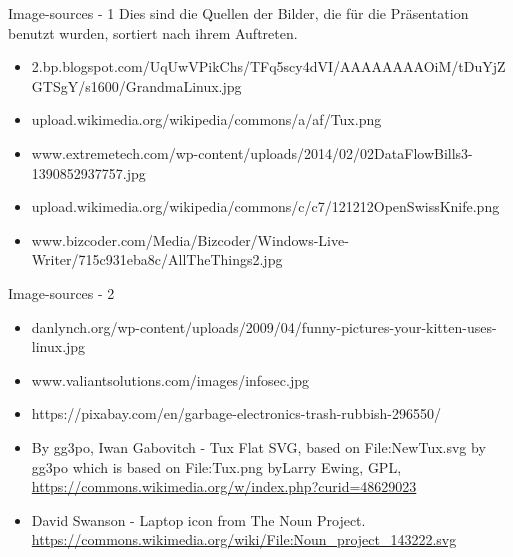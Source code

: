 \begin{frame}{Image-sources - 1}
Dies sind die Quellen der Bilder, die für die Präsentation benutzt wurden, sortiert nach ihrem Auftreten.
\begin{itemize}
	\item [1] 2.bp.blogspot.com/\textunderscore UqUwVPikChs/TFq5scy4dVI/AAAAAAAAOiM/tDuYjZGTSgY/s1600/GrandmaLinux.jpg
	\item [2] upload.wikimedia.org/wikipedia/commons/a/af/Tux.png
	\item [3] www.extremetech.com/wp-content/uploads/2014/02/02DataFlowBills3-1390852937757.jpg
	
	\item [4] upload.wikimedia.org/wikipedia/commons/c/c7/121212\textunderscore OpenSwissKnife.png
	\item [5] www.bizcoder.com/Media/Bizcoder/Windows-Live-Writer/715c931eba8c/AllTheThings\textunderscore 2.jpg
	
\end{itemize}

\end{frame}

\begin{frame}{Image-sources - 2}
\begin{itemize}
	\item [6] danlynch.org/wp-content/uploads/2009/04/funny-pictures-your-kitten-uses-linux.jpg
	\item [7] www.valiantsolutions.com/images/infosec.jpg
	\item [8] https://pixabay.com/en/garbage-electronics-trash-rubbish-296550/
	\item [9] By gg3po, Iwan Gabovitch - Tux Flat SVG, based on File:NewTux.svg by gg3po which is based on File:Tux.png byLarry Ewing, GPL, \url{https://commons.wikimedia.org/w/index.php?curid=48629023}
	\item [9] David Swanson - Laptop icon from The Noun Project. \url{https://commons.wikimedia.org/wiki/File:Noun_project_143222.svg}
\end{itemize}
\end{frame}
